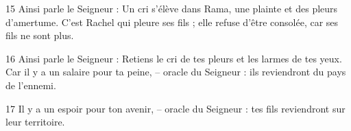 15 Ainsi parle le Seigneur : Un cri s’élève dans Rama, une plainte et des pleurs d’amertume. C’est Rachel qui pleure ses fils ; elle refuse d’être consolée, car ses fils ne sont plus.

16 Ainsi parle le Seigneur : Retiens le cri de tes pleurs et les larmes de tes yeux. Car il y a un salaire pour ta peine, – oracle du Seigneur : ils reviendront du pays de l’ennemi.

17 Il y a un espoir pour ton avenir, – oracle du Seigneur : tes fils reviendront sur leur territoire.
